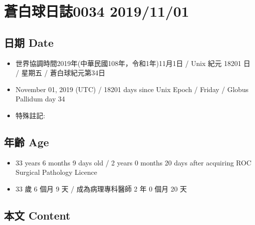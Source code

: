 \documentclass[
]{article}
\date{}
\providecommand{\tightlist}{%
  \setlength{\itemsep}{0pt}\setlength{\parskip}{0pt}}
\begin{document}
\hypertarget{ux84bcux767dux7403ux65e5ux8a8c0034-20191101}{%
\section{蒼白球日誌0034
2019/11/01}\label{ux84bcux767dux7403ux65e5ux8a8c0034-20191101}}

\hypertarget{ux65e5ux671f-date}{%
\subsection{日期 Date}\label{ux65e5ux671f-date}}

\begin{itemize}
\tightlist
\item
  世界協調時間2019年(中華民國108年，令和1年)11月1日 / Unix 紀元 18201 日
  / 星期五 / 蒼白球紀元第34日
\item
  November 01, 2019 (UTC) / 18201 days since Unix Epoch / Friday /
  Globus Pallidum day 34
\item
  特殊註記:
\end{itemize}

\hypertarget{ux5e74ux9f61-age}{%
\subsection{年齡 Age}\label{ux5e74ux9f61-age}}

\begin{itemize}
\tightlist
\item
  33 years 6 months 9 days old / 2 years 0 months 20 days after
  acquiring ROC Surgical Pathology Licence
\item
  33 歲 6 個月 9 天 / 成為病理專科醫師 2 年 0 個月 20 天
\end{itemize}

\hypertarget{ux672cux6587-content}{%
\subsection{本文 Content}\label{ux672cux6587-content}}
\end{document}
